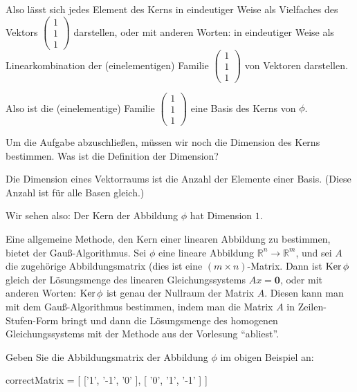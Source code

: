 \documentclass{ximera}
\begin{document}
Also lässt sich jedes Element des Kerns in eindeutiger Weise als Vielfaches des Vektors 
$\left( \begin{array}{c}
    1 \\ 1\\ 1
\end{array} \right)$ darstellen, oder mit anderen Worten: in eindeutiger Weise als Linearkombination der (einelementigen) Familie
$\left( \begin{array}{c}
    1 \\ 1\\ 1
\end{array} \right)$ von Vektoren darstellen.

Also ist die (einelementige) Familie 
$\left( \begin{array}{c}
    1 \\ 1\\ 1
\end{array} \right)$ eine Basis des Kerns von $\phi$.


\begin{question}
Um die Aufgabe abzuschließen, müssen wir noch die Dimension des Kerns bestimmen. Was ist die Definition der Dimension?
    \begin{solution}
        \begin{free-response}
Die Dimension eines Vektorraums ist die Anzahl der Elemente einer Basis. (Diese Anzahl ist für alle Basen gleich.)
        \end{free-response}
    \end{solution}
\end{question}


Wir sehen also: Der Kern der Abbildung $\phi$ hat Dimension $1$.



Eine allgemeine Methode, den Kern einer linearen Abbildung zu bestimmen, bietet der Gauß-Algorithmus. Sei $\phi$ eine lineare Abbildung $\mathbb R^n\rightarrow \mathbb R^m$, und sei $A$ die zugehörige Abbildungsmatrix (dies ist eine $(m\times n)$-Matrix. Dann ist $\mathop{\rm Ker} \phi$ gleich der Lösungsmenge des linearen Gleichungssystems $Ax=\mathbf{0}$, oder mit anderen Worten: $\mathop{\rm Ker} \phi$ ist genau der Nullraum der Matrix $A$. Diesen kann man mit dem Gauß-Algorithmus bestimmen, indem man die Matrix $A$ in Zeilen-Stufen-Form bringt und dann die Lösungsmenge des homogenen Gleichungssystems mit der Methode aus der Vorlesung ``abliest''.

\begin{question}
Geben Sie die Abbildungsmatrix der Abbildung $\phi$ im obigen Beispiel an:
\begin{matrix-answer}
correctMatrix = [ ['1', '-1', '0' ], [ '0', '1', '-1' ] ]
\end{matrix-answer}
\end{question}
\end{document}
